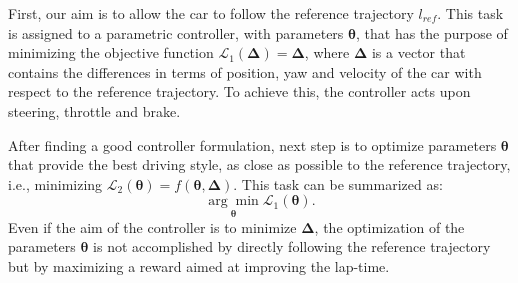 




First, our aim is to allow the car to follow the reference trajectory $l_{ref}$. This task is assigned to a parametric controller, with parameters $\boldsymbol \theta$, that has the purpose of minimizing the objective function $\mathcal{L}_1(\boldsymbol{\Delta}) = \boldsymbol{\Delta}$, where $\boldsymbol{\Delta}$ is a vector that contains the differences in terms of position, yaw and velocity of the car with respect to the reference trajectory. To achieve this, the controller acts upon steering, throttle and brake. 

After finding a good controller formulation, next step is to optimize parameters $\boldsymbol{\theta}$ that provide the best driving style, as close as possible to the reference trajectory, i.e., minimizing $\mathcal{L}_2(\boldsymbol{\theta}) = f(\boldsymbol{\theta}, \boldsymbol{\Delta})$. This task can be summarized as:
\[\underset{\boldsymbol{\theta}}{\arg\min} \mathcal{L}_1(\boldsymbol{\theta}).\]
Even if the aim of the controller is to minimize $\boldsymbol{\Delta}$, the optimization of the parameters $\boldsymbol{\theta}$ is not accomplished by directly following the reference trajectory but by maximizing a reward aimed at improving the lap-time.


